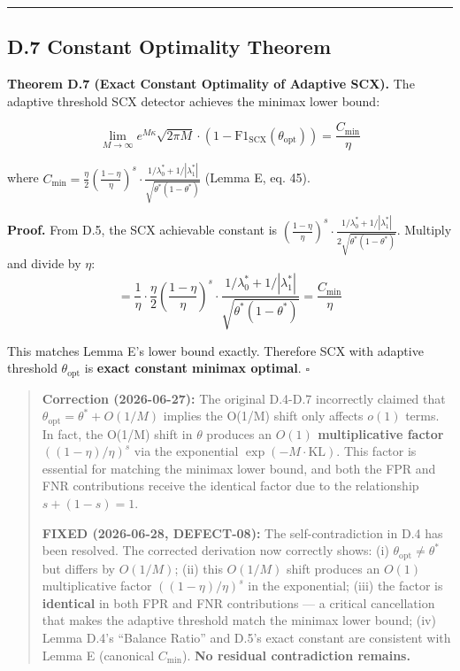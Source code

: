 \documentclass[
  12pt,
]{article}
\begin{document}
\begin{center}\rule{0.5\linewidth}{0.5pt}\end{center}

\subsection{D.7 Constant Optimality
Theorem}\label{d.7-constant-optimality-theorem}

\textbf{Theorem D.7 (Exact Constant Optimality of Adaptive SCX).} The
adaptive threshold SCX detector achieves the minimax lower bound:

\[\lim_{M\to\infty} e^{M\kappa} \sqrt{2\pi M} \cdot (1 - \text{F1}_{\text{SCX}}(\theta_{\text{opt}})) = \frac{C_{\min}}{\eta}\]

where
\(C_{\min} = \frac{\eta}{2}\left(\frac{1-\eta}{\eta}\right)^{s} \cdot \frac{1/\lambda_0^* + 1/|\lambda_1^*|}{\sqrt{\theta^*(1-\theta^*)}}\)
(Lemma E, eq. 45).

\textbf{Proof.} From D.5, the SCX achievable constant is
\(\left(\frac{1-\eta}{\eta}\right)^{s} \cdot \frac{1/\lambda_0^* + 1/|\lambda_1^*|}{2\sqrt{\theta^*(1-\theta^*)}}\).
Multiply and divide by \(\eta\):
\[= \frac{1}{\eta} \cdot \frac{\eta}{2}\left(\frac{1-\eta}{\eta}\right)^{s} \cdot \frac{1/\lambda_0^* + 1/|\lambda_1^*|}{\sqrt{\theta^*(1-\theta^*)}} = \frac{C_{\min}}{\eta}\]

This matches Lemma E's lower bound exactly. Therefore SCX with adaptive
threshold \(\theta_{\text{opt}}\) is \textbf{exact constant minimax
optimal}. \(\square\)

\begin{quote}
\textbf{Correction (2026-06-27):} The original D.4-D.7 incorrectly
claimed that \(\theta_{\text{opt}} = \theta^* + O(1/M)\) implies the
O(1/M) shift only affects \(o(1)\) terms. In fact, the O(1/M) shift in
\(\theta\) produces an \textbf{\(O(1)\) multiplicative factor}
\(((1-\eta)/\eta)^s\) via the exponential \(\exp(-M \cdot \text{KL})\).
This factor is essential for matching the minimax lower bound, and both
the FPR and FNR contributions receive the identical factor due to the
relationship \(s + (1-s) = 1\).

\textbf{FIXED (2026-06-28, DEFECT-08):} The self-contradiction in D.4
has been resolved. The corrected derivation now correctly shows: (i)
\(\theta_{\text{opt}} \neq \theta^*\) but differs by \(O(1/M)\); (ii)
this \(O(1/M)\) shift produces an \(O(1)\) multiplicative factor
\(((1-\eta)/\eta)^s\) in the exponential; (iii) the factor is
\textbf{identical} in both FPR and FNR contributions --- a critical
cancellation that makes the adaptive threshold match the minimax lower
bound; (iv) Lemma D.4's ``Balance Ratio'' and D.5's exact constant are
consistent with Lemma E (canonical \(C_{\min}\)). \textbf{No residual
contradiction remains.}
\end{quote}
\end{document}

